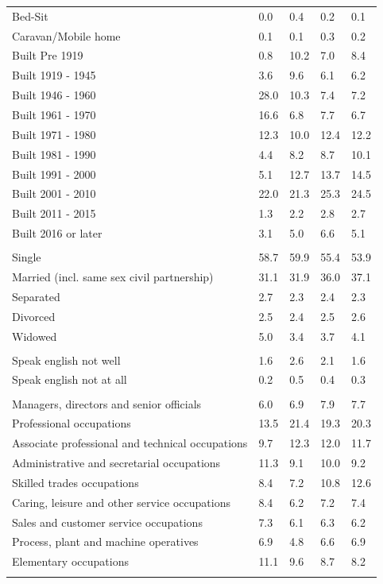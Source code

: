 \documentclass{article}
\begin{document}
\begin{table}[h]
\begin{tabular}{KTTTT}
Bed-Sit & 0.0& 0.4& 0.2& 0.1\\
Caravan/Mobile home & 0.1& 0.1& 0.3& 0.2\\
    \hline
Built Pre 1919 &  0.8& 10.2&  7.0&  8.4\\
Built 1919 - 1945 & 3.6& 9.6& 6.1& 6.2\\
Built  1946 - 1960 & 28.0& 10.3&  7.4&  7.2\\
Built  1961 - 1970 & 16.6&  6.8&  7.7&  6.7\\
Built  1971 - 1980 & 12.3& 10.0& 12.4& 12.2\\
Built  1981 - 1990 &  4.4&  8.2&  8.7& 10.1\\
Built  1991 - 2000 &  5.1& 12.7& 13.7& 14.5\\
Built  2001 - 2010 & 22.0& 21.3& 25.3& 24.5\\
Built  2011 - 2015 & 1.3& 2.2& 2.8& 2.7\\
Built  2016 or later & 3.1& 5.0& 6.6& 5.1\\
\hline
    \\
    \hline
Single & 58.7& 59.9& 55.4& 53.9\\
Married (incl. same sex civil partnership) & 31.1& 31.9& 36.0& 37.1\\
Separated  & 2.7& 2.3& 2.4& 2.3\\
Divorced  & 2.5& 2.4& 2.5& 2.6\\
Widowed & 5.0& 3.4& 3.7& 4.1\\
\hline
    \\ 
    \hline
Speak english not well & 1.6& 2.6& 2.1& 1.6\\
Speak english not at all & 0.2& 0.5& 0.4& 0.3\\
\hline
    \\
    \hline
Managers, directors and senior officials & 6.0& 6.9& 7.9& 7.7\\
Professional occupations & 13.5& 21.4& 19.3& 20.3\\
Associate professional and technical occupations &  9.7& 12.3& 12.0& 11.7\\
Administrative and secretarial occupations & 11.3&  9.1& 10.0&  9.2\\
Skilled trades occupations &  8.4&  7.2& 10.8& 12.6\\
Caring, leisure and other service occupations & 8.4& 6.2& 7.2& 7.4\\
Sales and customer service occupations & 7.3& 6.1& 6.3& 6.2\\
Process, plant and machine operatives & 6.9& 4.8& 6.6& 6.9\\
Elementary occupations & 11.1&  9.6&  8.7&  8.2\\
\hline
\end{tabular}
\end{table}
\end{document}
